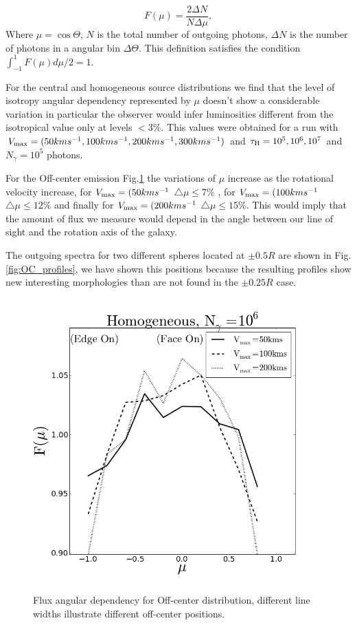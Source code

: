 \documentclass{emulateapj}
\begin{document}
\begin{equation}
F(\mu) = \frac{2\Delta N}{N\Delta \mu}, 
\end{equation}
%
Where $\mu=\cos\Theta$, $N$ is the total number of outgoing photons,
$\Delta N$ is the number of photons in a angular bin $\Delta
\Theta$. This definition satisfies the condition
$\int_{-1}^{1}F(\mu)d\mu/2=1$. 


For the central and homogeneous source distributions we find that the
level of isotropy angular dependency represented by $\mu$ doesn't show
a considerable variation in particular the observer would infer
luminosities  different from the isotropical value only at levels $<
3\%$. This values were obtained for a run with $V_{\rm max}=(50kms^{-1}, 
100kms^{-1}, 200kms^{-1}, 300kms^{-1})$ and $\tau_{\rm H}=10^{5}, 10^{6}, 
10^{7}$ and $N_{\gamma}=10^{5}$ photons.

For the Off-center emission Fig.\ref{fig:OCflux} the variations of 
$\mu$ increase as the rotational velocity increase, for $V_{\rm max}=(50kms^{-1}$
 $\bigtriangleup\mu \leq 7\%$ , for $V_{\rm max}=(100kms^{-1}$
$\bigtriangleup\mu\leq 12\%$ and finally for $V_{\rm max}=(200kms^{-1}$
$\bigtriangleup\mu\leq 15\%$. This would imply that the amount of flux
we measure would depend in the angle between our line of sight and 
the rotation axis of the galaxy. 

The outgoing spectra for two different spheres located at $\pm 0.5R$ 
are shown in Fig.\ref{fig:OC_profiles}, we have shown this positions because
the resulting profiles show new interesting morphologies than are not
found in the $\pm 0.25R$ case.

\begin{figure}
\includegraphics[scale=0.3]{mu_OC.png}
\caption{Flux angular dependency for Off-center distribution, different line widths illustrate different
off-center positions.
   \label{fig:OCflux}} 
\end{figure}
\end{document}
